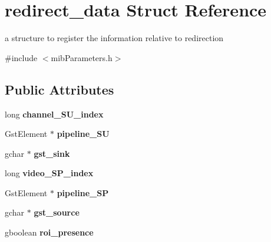 \hypertarget{structredirect__data}{}\section{redirect\+\_\+data Struct Reference}
\label{structredirect__data}


a structure to register the information relative to redirection  




{\ttfamily \#include $<$mib\+Parameters.\+h$>$}

\subsection*{Public Attributes}
\begin{DoxyCompactItemize}
\item 
long {\bfseries channel\+\_\+\+S\+U\+\_\+index}\hypertarget{structredirect__data_a836b9ab47c9a378de37466e518edc158}{}\label{structredirect__data_a836b9ab47c9a378de37466e518edc158}

\item 
Gst\+Element $\ast$ {\bfseries pipeline\+\_\+\+SU}\hypertarget{structredirect__data_a32a3cd0a2f1023c6837a2d0e6c03b5bf}{}\label{structredirect__data_a32a3cd0a2f1023c6837a2d0e6c03b5bf}

\item 
gchar $\ast$ {\bfseries gst\+\_\+sink}\hypertarget{structredirect__data_a7fcd2c435d8a65645c3179e1feadc143}{}\label{structredirect__data_a7fcd2c435d8a65645c3179e1feadc143}

\item 
long {\bfseries video\+\_\+\+S\+P\+\_\+index}\hypertarget{structredirect__data_aa3966779da89c4d6fae60ac30e475eb4}{}\label{structredirect__data_aa3966779da89c4d6fae60ac30e475eb4}

\item 
Gst\+Element $\ast$ {\bfseries pipeline\+\_\+\+SP}\hypertarget{structredirect__data_afbab1f9f82b0f5870954d90f9a3c1c67}{}\label{structredirect__data_afbab1f9f82b0f5870954d90f9a3c1c67}

\item 
gchar $\ast$ {\bfseries gst\+\_\+source}\hypertarget{structredirect__data_afce4a3523c893c0f77feb9caaf1c44a7}{}\label{structredirect__data_afce4a3523c893c0f77feb9caaf1c44a7}

\item 
gboolean {\bfseries roi\+\_\+presence}\hypertarget{structredirect__data_a7ac6d45841559ce7276dbe1e4782a246}{}\label{structredirect__data_a7ac6d45841559ce7276dbe1e4782a246}

\end{DoxyCompactItemize}


